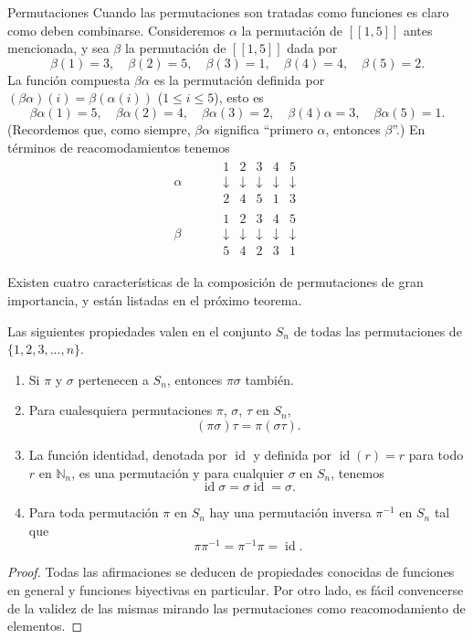 \begin{section}{Permutaciones}
Cuando las permutaciones son tratadas como funciones es claro como deben combinarse. Consideremos $\alpha$ la permutación de $[[1,5]]$ antes mencionada, y sea $\beta$ la permutación de $[[1,5]]$ dada por 
$$
\beta(1)=3,\quad \beta(2)=5,\quad \beta(3)=1,\quad
\beta(4)=4,\quad \beta(5)=2.
$$
La función compuesta $\beta\alpha$ es la permutación definida por $(\beta\alpha)(i)= \beta(\alpha(i))$ ($1\le i\le 5$), esto es 
$$
\beta\alpha(1)=5,\quad \beta\alpha(2)=4,\quad
\beta\alpha(3)=2,\quad \beta(4)\alpha=3,\quad \beta\alpha(5)=1.
$$
(Recordemos que, como siempre, $\beta\alpha$ significa ``primero $\alpha$, entonces $\beta$''.) En términos de reacomodamientos tenemos
$$\begin{aligned}
\alpha\quad&\quad\begin{matrix} 1&2&3&4&5 \\
\downarrow&\downarrow&\downarrow&\downarrow&\downarrow\\2 &4 &5 &1
& 3
\end{matrix} \\
\beta \quad&\quad \begin{matrix} 1&2&3&4&5 \\
\downarrow&\downarrow&\downarrow&\downarrow&\downarrow\\5 &4 &2 &3
& 1
\end{matrix}
 \end{aligned}
$$



Existen cuatro características de la composición de permutaciones de gran importancia, y están listadas en el próximo teorema.

\begin{teorema}\label{tA3} Las siguientes propiedades valen en el conjunto $S_n$ de todas las permutaciones de $\{1,2,3,...,n\}$.
\begin{enumerate}[label=\textit{\alph*)}]
\item  Si $\pi$ y $\sigma$ pertenecen a $S_n$, entonces $\pi\sigma$ también.
\item  Para cualesquiera permutaciones $\pi$, $\sigma$, $\tau$ en $S_n$,
$$
(\pi\sigma)\tau=\pi(\sigma\tau).$$
\item  La función identidad, denotada por $\operatorname{id}$ y definida por $\operatorname{id}(r) =r$ para todo $r$ en $\mathbb N_n$, es una permutación y para cualquier $\sigma$ en $S_n$,
tenemos
$$
\operatorname{id}\sigma=\sigma\operatorname{id}=\sigma.$$
\item  Para toda permutación $\pi$ en $S_n$ hay una permutación inversa $\pi^{-1}$ en $S_n$ tal que
$$
\pi\pi^{-1} = \pi^{-1}\pi = \operatorname{id}.
$$
\end{enumerate}
\end{teorema}
\begin{proof} Todas las afirmaciones se deducen de propiedades conocidas de funciones en general y funciones biyectivas en particular. Por otro lado, es fácil convencerse de la validez de las mismas mirando las permutaciones como reacomodamiento de elementos. 
\end{proof}



\end{section}
